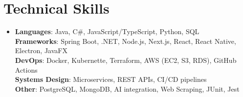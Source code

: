 \documentclass[letterpaper,11pt]{article}
\begin{document}
\section{Technical Skills} %
\begin{itemize}[leftmargin=0.15in, label={}]
\item{
\textbf{Languages}{: Java, C\#, JavaScript/TypeScript, Python, SQL} \\
\textbf{Frameworks}{: Spring Boot, .NET, Node.js, Next.js, React, React Native, Electron, JavaFX} \\
\textbf{DevOps}{: Docker, Kubernette, Terraform, AWS (EC2, S3, RDS), GitHub Actions} \\
\textbf{Systems Design}{: Microservices, REST APIs, CI/CD pipelines} \\
\textbf{Other}{: PostgreSQL, MongoDB, AI integration, Web Scraping, JUnit, Jest}
} \\
\end{itemize}


\end{document}
